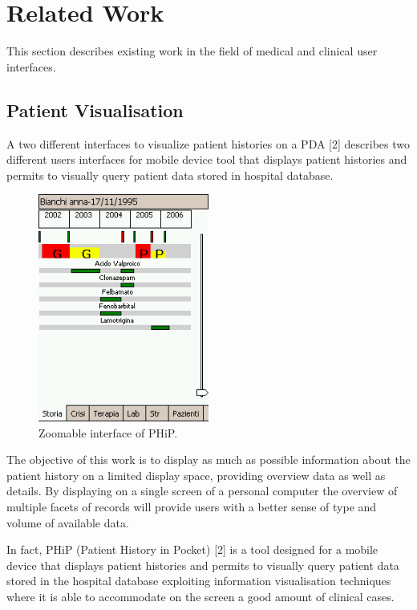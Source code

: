 \section{Related Work}

This section describes existing work in the field of medical and clinical user interfaces.

\subsection{Patient Visualisation}

A two different interfaces to visualize patient histories on a PDA [2] describes two different users interfaces for mobile device tool that displays patient histories and permits to visually query patient data stored in hospital database.

\clearpage

\begin{figure}[!hbt]
\centering
\includegraphics[width=0.50\textwidth]{zoomable.png}
\caption{\label{fig:zoomable}Zoomable interface of PHiP.
}
\end{figure}

The objective of this work is to display as much as possible information about the patient history on a limited display space, providing overview data as well as details. By displaying on a single screen of a personal computer the overview of multiple facets of records will provide users with a better sense of type and volume of available data.

In fact, PHiP (Patient History in Pocket) [2] is a tool designed for a mobile device that displays patient histories and permits to visually query patient data stored in the hospital database exploiting information visualisation techniques where it is able to accommodate on the screen a good amount of clinical cases.

